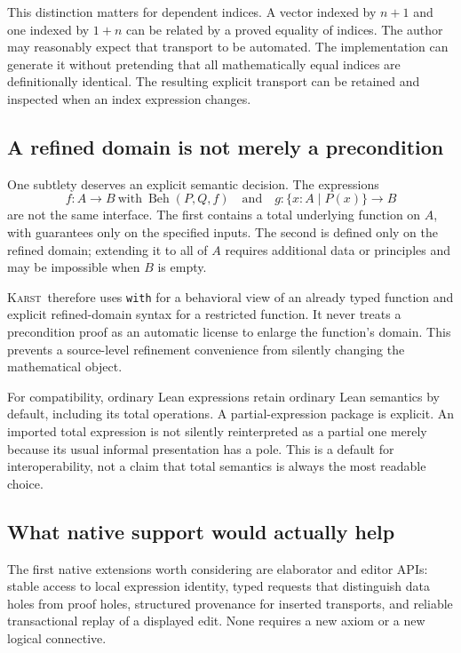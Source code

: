 \documentclass[11pt,letterpaper]{article}
\newcommand{\code}[1]{\nolinkurl{#1}}
\newcommand{\Karst}{\textsc{Karst}}
\theoremstyle{remark}
\begin{document}
This distinction matters for dependent indices. A vector indexed by $n+1$
and one indexed by $1+n$ can be related by a proved equality of indices.
The author may reasonably expect that transport to be automated. The
implementation can generate it without pretending that all mathematically
equal indices are definitionally identical. The resulting explicit transport
can be retained and inspected when an index expression changes.

\subsection{A refined domain is not merely a precondition}
One subtlety deserves an explicit semantic decision. The expressions
\[
 f:A\to B\ \text{with}\ \operatorname{Beh}(P,Q,f)
 \quad\text{and}\quad
 g:\{x:A\mid P(x)\}\to B
\]
are not the same interface. The first contains a total underlying function on
$A$, with guarantees only on the specified inputs. The second is defined only
on the refined domain; extending it to all of $A$ requires additional data or
principles and may be impossible when $B$ is empty.

\Karst\ therefore uses \code{with} for a behavioral view of an already typed
function and explicit refined-domain syntax for a restricted function. It
never treats a precondition proof as an automatic license to enlarge the
function's domain. This prevents a source-level refinement convenience from
silently changing the mathematical object.

For compatibility, ordinary Lean expressions retain ordinary Lean semantics
by default, including its total operations. A partial-expression package is
explicit. An imported total expression is not silently reinterpreted as a
partial one merely because its usual informal presentation has a pole. This
is a default for interoperability, not a claim that total semantics is always
the most readable choice.

\subsection{What native support would actually help}
The first native extensions worth considering are elaborator and editor APIs:
stable access to local expression identity, typed requests that distinguish
data holes from proof holes, structured provenance for inserted transports,
and reliable transactional replay of a displayed edit. None requires a new
axiom or a new logical connective.
\end{document}
